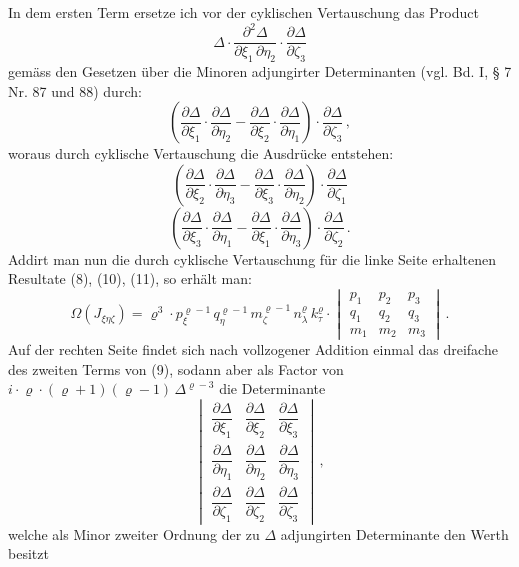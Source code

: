 \documentclass[11pt]{article}
\providecommand{\weberpage}[1]{}
\providecommand{\weq}[2]{\begin{equation}\tag{#1}#2\end{equation}}
\let\Delta\varDelta
\let\Omega\varOmega
\begin{document}
\weberpage{118}
In dem ersten Term ersetze ich vor der cyklischen Vertauschung das Product
\[
\Delta \cdot \frac{\partial^2 \Delta}{\partial \xi_1\, \partial \eta_2} \cdot \frac{\partial \Delta}{\partial \zeta_3}
\]
gem\"ass den Gesetzen \"uber die Minoren adjungirter Determinanten (vgl. Bd. I, § 7 Nr. 87 und 88) durch:
\weq{12}{\left(\frac{\partial \Delta}{\partial \xi_1} \cdot \frac{\partial \Delta}{\partial \eta_2} - \frac{\partial \Delta}{\partial \xi_2} \cdot \frac{\partial \Delta}{\partial \eta_1}\right) \cdot \frac{\partial \Delta}{\partial \zeta_3}\,,}
woraus durch cyklische Vertauschung die Ausdr\"ucke entstehen:
\weq{13}{\left(\frac{\partial \Delta}{\partial \xi_2} \cdot \frac{\partial \Delta}{\partial \eta_3} - \frac{\partial \Delta}{\partial \xi_3} \cdot \frac{\partial \Delta}{\partial \eta_2}\right) \cdot \frac{\partial \Delta}{\partial \zeta_1}}
\weq{14}{\left(\frac{\partial \Delta}{\partial \xi_3} \cdot \frac{\partial \Delta}{\partial \eta_1} - \frac{\partial \Delta}{\partial \xi_1} \cdot \frac{\partial \Delta}{\partial \eta_3}\right) \cdot \frac{\partial \Delta}{\partial \zeta_2}\,.}
Addirt man nun die durch cyklische Vertauschung f\"ur die linke Seite erhaltenen Resultate (8), (10), (11), so erh\"alt man:
\[
\Omega(J_{\xi\eta\zeta}) = \varrho^3 \cdot p_{\xi}^{\varrho-1}\, q_{\eta}^{\varrho-1}\, m_{\zeta}^{\varrho-1}\, n_{\lambda}^{\varrho}\, k_{\tau}^{\varrho} \cdot
\begin{vmatrix}
p_1 & p_2 & p_3\\
q_1 & q_2 & q_3\\
m_1 & m_2 & m_3
\end{vmatrix}\,.
\]
Auf der rechten Seite findet sich nach vollzogener Addition einmal das dreifache des zweiten Terms von (9), sodann aber als Factor von $i \cdot \varrho \cdot (\varrho+1)(\varrho-1)\, \Delta^{\varrho-3}$ die Determinante
\[
\begin{vmatrix}
\dfrac{\partial \Delta}{\partial \xi_1} & \dfrac{\partial \Delta}{\partial \xi_2} & \dfrac{\partial \Delta}{\partial \xi_3}\\[6pt]
\dfrac{\partial \Delta}{\partial \eta_1} & \dfrac{\partial \Delta}{\partial \eta_2} & \dfrac{\partial \Delta}{\partial \eta_3}\\[6pt]
\dfrac{\partial \Delta}{\partial \zeta_1} & \dfrac{\partial \Delta}{\partial \zeta_2} & \dfrac{\partial \Delta}{\partial \zeta_3}
\end{vmatrix}\,,
\]
welche als Minor zweiter Ordnung der zu $\Delta$ adjungirten Determinante den Werth besitzt
\end{document}
